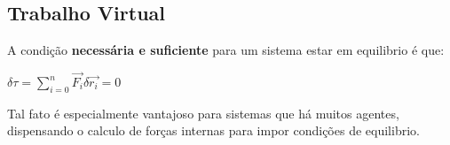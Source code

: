 \subsection{Trabalho Virtual}

A condição \textbf{necessária e suficiente} para um sistema estar em equilibrio é que:

$\delta \tau = \sum_{i=0}^n \vec{F_i}\delta\vec{r_i} = 0 $

Tal fato é especialmente vantajoso para sistemas que há muitos agentes, dispensando o calculo de forças internas para impor condições de equilibrio.























